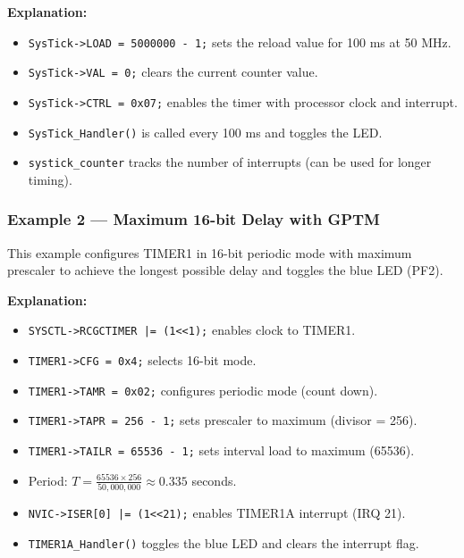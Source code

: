 

\noindent
\textbf{Explanation:}
\begin{itemize}[nosep]
  \item \texttt{SysTick->LOAD = 5000000 - 1;} sets the reload value for 100 ms at 50 MHz.
  \item \texttt{SysTick->VAL = 0;} clears the current counter value.
  \item \texttt{SysTick->CTRL = 0x07;} enables the timer with processor clock and interrupt.
  \item \texttt{SysTick\_Handler()} is called every 100 ms and toggles the LED.
  \item \texttt{systick\_counter} tracks the number of interrupts (can be used for longer timing).
\end{itemize}

\newpage
\subsubsection{Example 2 — Maximum 16-bit Delay with GPTM}

This example configures TIMER1 in 16-bit periodic mode with maximum prescaler to achieve the longest possible delay and toggles the blue LED (PF2).



\noindent
\textbf{Explanation:}
\begin{itemize}[nosep]
  \item \texttt{SYSCTL->RCGCTIMER |= (1<<1);} enables clock to TIMER1.
  \item \texttt{TIMER1->CFG = 0x4;} selects 16-bit mode.
  \item \texttt{TIMER1->TAMR = 0x02;} configures periodic mode (count down).
  \item \texttt{TIMER1->TAPR = 256 - 1;} sets prescaler to maximum (divisor = 256).
  \item \texttt{TIMER1->TAILR = 65536 - 1;} sets interval load to maximum (65536).
  \item Period: $T = \frac{65536 \times 256}{50{,}000{,}000} \approx 0.335$ seconds.
  \item \texttt{NVIC->ISER[0] |= (1<<21);} enables TIMER1A interrupt (IRQ 21).
  \item \texttt{TIMER1A\_Handler()} toggles the blue LED and clears the interrupt flag.
\end{itemize}

